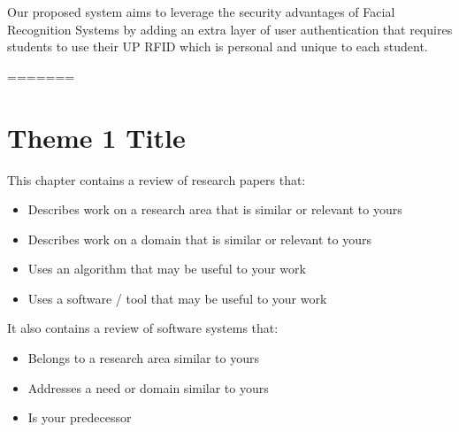 Our proposed system aims to leverage the security advantages of Facial Recognition Systems by adding an extra layer of user authentication that requires students to use their UP RFID which is personal and unique to each student.

\begin{comment}

%
%
Guide on Writing your RRL chapter

1. Identify the keywords with respect to your research
      One keyword = One document section
                Examples: 2.1 Story Generation Systems
			 2.2 Knowledge Representation

2.  Find references using these keywords

3.  For each of the references that you find,
        Check: Is it relevant to your research?
        Use their references to find more relevant works.

4. Identify a set of criteria for comparison.
       It will serve as a guide to help you focus on what to look for

5. Write a summary focusing on -
       What: A short description of the work
       How: A summary of the approach it utilized
       Findings: If applicable, provide the results
        Why: Relevance to your work

6. At the end of each section,  show a Table of Comparison of the related works
   and your proposed project/system

<<<<<<< HEAD
\end{comment}
=======
\section{Theme 1 Title}
This chapter  contains a review of research papers that:
%
%
\begin{itemize}
	\item Describes work on a research area that is similar or relevant to yours
	\item Describes work on a domain that is similar or relevant to yours
	\item Uses an algorithm that may be useful to your work
	\item Uses a software / tool that may be useful to your work
\end{itemize}

It also contains a review of software systems that:
%
%
\begin{itemize}
	\item Belongs to a research area similar to yours
	\item Addresses a need or domain similar to yours
	\item Is your predecessor
\end{itemize}

